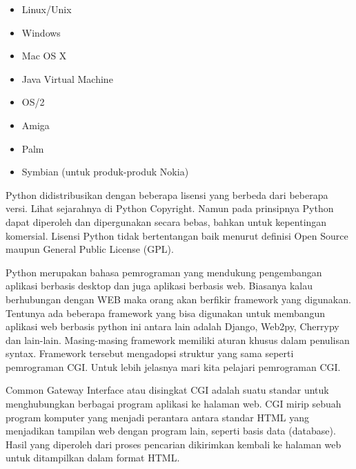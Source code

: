 \begin{enumerate}
\noindent 
\begin{itemize}
	\item Linux/Unix \par
	\noindent 
	\item Windows \par
	\noindent 
	\item Mac OS X \par
	\noindent 
	\item Java Virtual Machine \par
	\noindent 
	\item OS/2 \par
	\noindent 
	\item Amiga \par
	\noindent 
	\item Palm \par
	\noindent 
	\item Symbian (untuk produk-produk Nokia)\end{itemize}
\par
\vspace{12pt}
Python didistribusikan dengan beberapa lisensi yang berbeda dari beberapa versi. Lihat sejarahnya di Python Copyright. Namun pada prinsipnya Python dapat diperoleh dan dipergunakan secara bebas, bahkan untuk kepentingan komersial. Lisensi Python tidak bertentangan baik menurut definisi Open Source maupun General Public License (GPL). \par
\vspace{12pt}
Python merupakan bahasa pemrograman yang mendukung pengembangan aplikasi berbasis desktop dan juga aplikasi berbasis web. Biasanya kalau berhubungan dengan WEB maka orang akan berfikir framework yang digunakan. Tentunya ada beberapa framework yang bisa digunakan untuk membangun aplikasi web berbasis python ini antara lain adalah Django, Web2py, Cherrypy dan lain-lain. Masing-masing framework memiliki aturan khusus dalam penulisan syntax. Framework tersebut mengadopsi struktur yang sama seperti pemrograman CGI. Untuk lebih jelasnya mari kita pelajari pemrograman CGI. \par
\vspace{12pt}
Common Gateway Interface atau disingkat CGI adalah suatu standar untuk menghubungkan berbagai program aplikasi ke halaman web. CGI mirip sebuah program komputer yang menjadi perantara antara standar HTML yang menjadikan tampilan web dengan program lain, seperti basis data (database). Hasil yang diperoleh dari proses pencarian dikirimkan kembali ke halaman web untuk ditampilkan dalam format HTML. \par

\end{enumerate}
